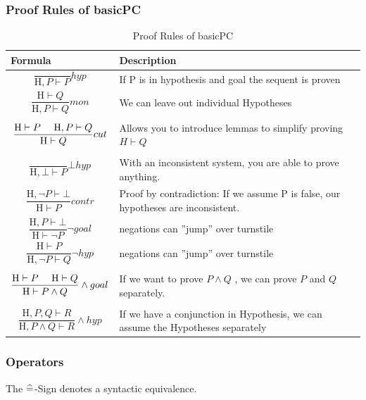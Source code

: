 \subsubsection{Proof Rules of basicPC}
\begin{table}[h]
	\centering
	\begin{tabu} to \linewidth {l X}
		\toprule
		Formula & Description \\
		\midrule
		\tabmath\[\frac{}{\text{H},P \vdash P} hyp \] &
			If P is in hypothesis and goal the sequent is proven \\
		\tabmath\[ \frac{\text{H} \vdash Q}{\text{H},P \vdash Q} mon \] &
			We can leave out individual Hypotheses \\
		\tabmath\[ \frac{\text{H} \vdash P \text{ }\text{ }\text{ }\text{ } \text{H}, P \vdash Q}{\text{H} \vdash Q} cut \] &
			Allows you to introduce lemmas to simplify proving  $H \vdash Q$ \\
		\tabmath\[ \frac{}{\text{H}, \bot \vdash P} \bot hyp \] &
			With an inconsistent system, you are able to prove anything. \\
		\tabmath\[ \frac{\text{H}, \neg P \vdash \bot}{\text{H} \vdash P} contr \] &
			Proof by contradiction: If we assume P is false, our hypotheses are inconsistent. \\
		\tabmath\[ \frac{\text{H}, P \vdash \bot}{\text{H} \vdash \neg P} \neg goal \] &
			negations can ''jump'' over turnstile \\
		\tabmath\[ \frac{\text{H} \vdash P}{\text{H}, \neg P \vdash Q} \neg hyp \] &
			negations can ''jump'' over turnstile \\
		\tabmath\[ \frac{\text{H} \vdash P \text{ }\text{ }\text{ }\text{ } \text{H} \vdash Q}{\text{H} \vdash P \land Q} \land goal \] &
			If we want to prove $P \land Q$ , we can prove $P$ and $Q$ separately. \\
		\tabmath\[ \frac{\text{H},P,Q \vdash R}{\text{H},P \land Q \vdash R} \land hyp \] &
			If we have a conjunction in Hypothesis, we can assume the Hypotheses separately \\
		\bottomrule
	\end{tabu}
	\label{tbl:ProofRulesBasicPC}
	\caption{Proof Rules of basicPC}
\end{table}


\subsubsection{Operators}

The $\widehat{=}$-Sign denotes a syntactic equivalence.


